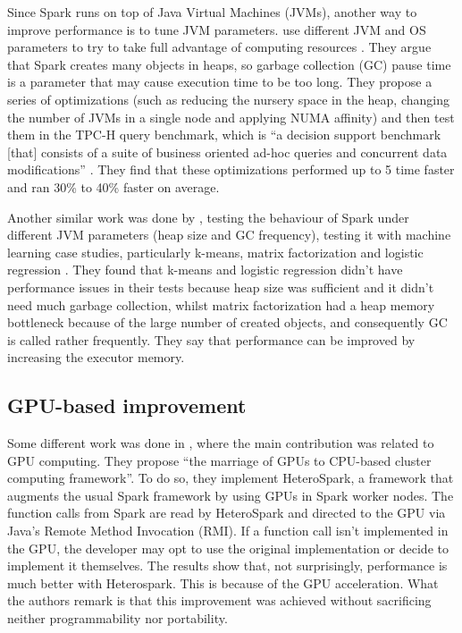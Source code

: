 \documentclass{article}
\begin{document}
Since Spark runs on top of Java Virtual Machines (JVMs), another way to improve performance is to tune JVM parameters. \citeauthor{Chiba2016} use different JVM and OS parameters to try to take full advantage of computing resources \cite{Chiba2016}. They argue that Spark creates many objects in heaps, so garbage collection (GC) pause time is a parameter that may cause execution time to be too long. They propose a series of optimizations (such as reducing the nursery space in the heap, changing the number of JVMs in a single node and applying NUMA affinity) and then test them in the TPC-H query benchmark,  which is ``a decision support benchmark [that] consists of a suite of business oriented ad-hoc queries and concurrent data modifications'' \cite{TPC_H_benchmark}. They find that these optimizations performed up to 5 time faster and ran 30\% to 40\% faster on average.

Another similar work was done by \citeauthor{Hema2016}, testing the behaviour of Spark under different JVM parameters (heap size and GC frequency), testing it with machine learning case studies, particularly k-means, matrix factorization and logistic regression \cite{Hema2016}. They found that k-means and logistic regression didn't have performance issues in their tests because heap size was sufficient and it didn't need much garbage collection, whilst matrix factorization had a heap memory bottleneck because of the large number of created objects, and consequently GC is called rather frequently. They say that performance can be improved by increasing the executor memory.

\subsection{GPU-based improvement}

Some different work was done in \cite{Li2015}, where the main contribution was related to GPU computing. They propose ``the marriage of GPUs to CPU-based cluster computing framework''. To do so, they implement HeteroSpark, a framework that augments the usual Spark framework by using GPUs in Spark worker nodes. The function calls from Spark are read by HeteroSpark and directed to the GPU via Java's Remote Method Invocation (RMI). If a function call isn't implemented in the GPU, the developer may opt to use the original implementation or decide to implement it themselves. The results show that, not surprisingly, performance is much better with Heterospark. This is because of the GPU acceleration. What the authors remark is that this improvement was achieved without sacrificing neither programmability nor portability.
\end{document}
